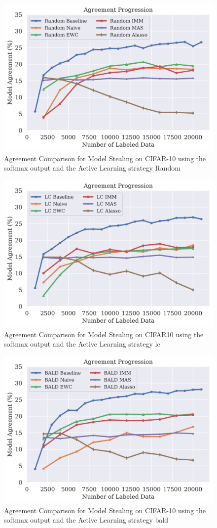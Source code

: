\begin{figure}[!htb]
    \centering
    \includegraphics[width=0.5\linewidth]{images/results_CALMS/cifar100_softmax_random.png}
    \caption{Agreement Comparison for Model Stealing on CIFAR-10 using the softmax output and the Active Learning strategy Random}
    \label{fig:CALMSCIFAR10SoftmaxRandom}
\end{figure}

\begin{figure}[!htb]
    \centering
    \includegraphics[width=0.5\linewidth]{images/results_CALMS/cifar100_softmax_lc.png}
    \caption{Agreement Comparison for Model Stealing on CIFAR10 using the softmax output and the Active Learning strategy \gls{lc}}
    \label{fig:CALMSCIFAR10SoftmaxLC}
\end{figure}

\begin{figure}[!htb]
    \centering
    \includegraphics[width=0.5\linewidth]{images/results_CALMS/cifar100_softmax_bald.png}
    \caption{Agreement Comparison for Model Stealing on CIFAR-10 using the softmax output and the Active Learning strategy \gls{bald}}
    \label{fig:CALMSCIFAR10SoftmaxBALD}
\end{figure}

